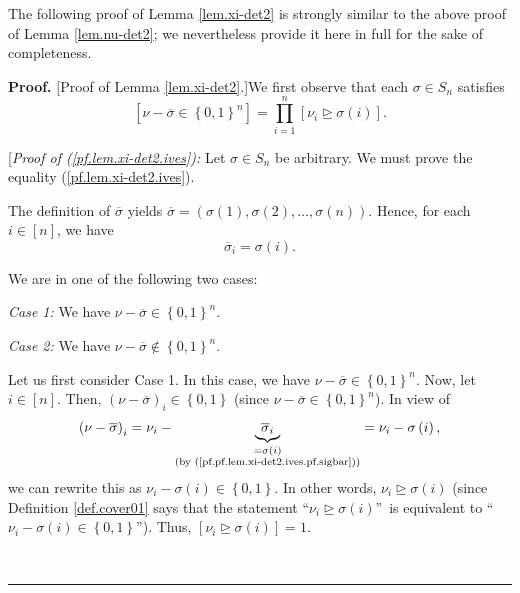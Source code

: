 \documentclass[numbers=enddot,12pt,final,onecolumn,notitlepage,english]{scrartcl}%
\theoremstyle{definition}
\newenvironment{proof}[1][Proof]{\noindent\textbf{#1.} }{\ \rule{0.5em}{0.5em}}
\let\prodnonlimits\prod
\renewcommand{\prod}{\prodnonlimits\limits}
\newenvironment{verlong}{}{}
\begin{document}
\begin{verlong}
The following proof of Lemma \ref{lem.xi-det2} is strongly similar to the
above proof of Lemma \ref{lem.nu-det2}; we nevertheless provide it here in
full for the sake of completeness.

\begin{proof}
[Proof of Lemma \ref{lem.xi-det2}.]We first observe that each $\sigma\in
S_{n}$ satisfies%
\begin{equation}
\left[  \nu-\overline{\sigma}\in\left\{  0,1\right\}  ^{n}\right]
=\prod_{i=1}^{n}\left[  \nu_{i}\trianglerighteq\sigma\left(  i\right)
\right]  . \label{pf.lem.xi-det2.ives}%
\end{equation}


[\textit{Proof of (\ref{pf.lem.xi-det2.ives}):} Let $\sigma\in S_{n}$ be
arbitrary. We must prove the equality (\ref{pf.lem.xi-det2.ives}).

The definition of $\overline{\sigma}$ yields $\overline{\sigma}=\left(
\sigma\left(  1\right)  ,\sigma\left(  2\right)  ,\ldots,\sigma\left(
n\right)  \right)  $. Hence, for each $i\in\left[  n\right]  $, we have%
\begin{equation}
\overline{\sigma}_{i}=\sigma\left(  i\right)  .
\label{pf.pf.lem.xi-det2.ives.pf.sigbar}%
\end{equation}


We are in one of the following two cases:

\textit{Case 1:} We have $\nu-\overline{\sigma}\in\left\{  0,1\right\}  ^{n}$.

\textit{Case 2:} We have $\nu-\overline{\sigma}\notin\left\{  0,1\right\}
^{n}$. \medskip

Let us first consider Case 1. In this case, we have $\nu-\overline{\sigma}%
\in\left\{  0,1\right\}  ^{n}$. Now, let $i\in\left[  n\right]  $. Then,
$\left(  \nu-\overline{\sigma}\right)  _{i}\in\left\{  0,1\right\}  $ (since
$\nu-\overline{\sigma}\in\left\{  0,1\right\}  ^{n}$). In view of
\[
\left(  \nu-\overline{\sigma}\right)  _{i}=\nu_{i}-\underbrace{\overline
{\sigma}_{i}}_{\substack{=\sigma\left(  i\right)  \\\text{(by
(\ref{pf.pf.lem.xi-det2.ives.pf.sigbar}))}}}=\nu_{i}-\sigma\left(  i\right)
,
\]
we can rewrite this as $\nu_{i}-\sigma\left(  i\right)  \in\left\{
0,1\right\}  $. In other words, $\nu_{i}\trianglerighteq\sigma\left(
i\right)  $ (since Definition \ref{def.cover01} says that the statement
\textquotedblleft$\nu_{i}\trianglerighteq\sigma\left(  i\right)
$\textquotedblright\ is equivalent to \textquotedblleft$\nu_{i}-\sigma\left(
i\right)  \in\left\{  0,1\right\}  $\textquotedblright). Thus, $\left[
\nu_{i}\trianglerighteq\sigma\left(  i\right)  \right]  =1$.


\end{proof}
\end{verlong}
\end{document}
